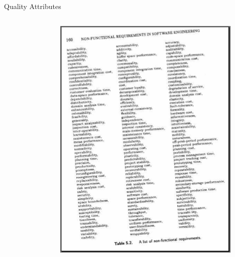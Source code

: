 \documentclass[10pt,t,a4paper]{beamer}
\begin{document}
\begin{frame}[shrink=35,label=sec-1-8]{Quality Attributes}
\begin{columns}
\begin{column}{0.7\textwidth}
\begin{verse}
\end{verse}
\end{column}
\begin{column}{0.2\textwidth}
\includegraphics[width=9cm]{./FQualityAttributes.png}
\end{column}
\end{columns}
\end{frame}
\end{document}
